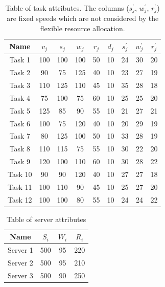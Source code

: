 \documentclass[sigconf]{aamas}
\begin{document}
\begin{table}[h]
    \centering
    \caption{Table of task attributes. The columns ($s^{'}_j$, $w^{'}_j$, $r^{'}_j$) are fixed speeds which are not considered by the flexible resource allocation.}
    \label{tab:example-task-properties}
    \begin{tabular}{|c|c|c|c|c|c|c|c|c|}
        \hline
        Name    & $v_j$ & $s_j$ & $w_j$ & $r_j$ & $d_j$ & $s^{'}_j$ & $w^{'}_j$ & $r^{'}_j$ \\ \hline
        Task 1  & 100   & 100   & 100   & 50    & 10    & 24        & 30        & 20        \\ \hline
        Task 2  & 90    & 75    & 125   & 40    & 10    & 23        & 27        & 19        \\ \hline
        Task 3  & 110   & 125   & 110   & 45    & 10    & 35        & 28        & 18        \\ \hline
        Task 4  & 75    & 100   & 75    & 60    & 10    & 25        & 25        & 20        \\ \hline
        Task 5  & 125   & 85    & 90    & 55    & 10    & 21        & 27        & 21        \\ \hline
        Task 6  & 100   & 75    & 120   & 40    & 10    & 20        & 29        & 19        \\ \hline
        Task 7  & 80    & 125   & 100   & 50    & 10    & 33        & 28        & 19        \\ \hline
        Task 8  & 110   & 115   & 75    & 55    & 10    & 30        & 22        & 20        \\ \hline
        Task 9  & 120   & 100   & 110   & 60    & 10    & 30        & 28        & 22        \\ \hline
        Task 10 & 90    & 90    & 120   & 40    & 10    & 27        & 27        & 18        \\ \hline
        Task 11 & 100   & 110   & 90    & 45    & 10    & 25        & 27        & 20        \\ \hline
        Task 12 & 100   & 100   & 80    & 55    & 10    & 24        & 24        & 22        \\ \hline
    \end{tabular}
\end{table}

\begin{table}[h]
    \centering
    \caption{Table of server attributes}
    \label{tab:example-server-properties}
    \begin{tabular}{|c|c|c|c|}
        \hline
        Name     & $S_i$ & $W_i$ & $R_i$ \\ \hline
        Server 1 & 500   & 95    & 220   \\ \hline
        Server 2 & 500   & 95    & 210   \\ \hline
        Server 3 & 500   & 90    & 250   \\ \hline
    \end{tabular}
\end{table}
\end{document}
